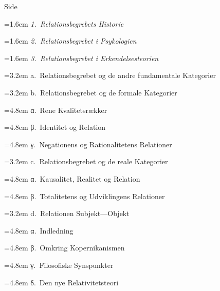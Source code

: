 \documentclass[12pt]{article}
\begin{document}
\vspace{1.2ex}
\begingroup
\parindent=0pt
\setlength{\parskip}{0pt}
\small
\mbox{}\hfill Side\par
\hangindent=1.6em \emph{1.~Relationsbegrebets Historie}\par
\hangindent=1.6em \emph{2.~Relationsbegrebet i Psykologien}\par
\hangindent=1.6em \emph{3.~Relationsbegrebet i Erkendelsesteorien}\par
\hangindent=3.2em \hspace*{1.6em}a.~Relationsbegrebet og de andre fundamentale Kategorier\par
\hangindent=3.2em \hspace*{1.6em}b.~Relationsbegrebet og de formale Kategorier\par
\hangindent=4.8em \hspace*{3.2em}α.~Rene Kvalitetsrækker\par
\hangindent=4.8em \hspace*{3.2em}β.~Identitet og Relation\par
\hangindent=4.8em \hspace*{3.2em}γ.~Negationens og Rationalitetens Relationer\par
\hangindent=3.2em \hspace*{1.6em}c.~Relationsbegrebet og de reale Kategorier\par
\hangindent=4.8em \hspace*{3.2em}α.~Kausalitet, Realitet og Relation\par
\hangindent=4.8em \hspace*{3.2em}β.~Totalitetens og Udviklingens Relationer\par
\hangindent=3.2em \hspace*{1.6em}d.~Relationen Subjekt---Objekt\par
\hangindent=4.8em \hspace*{3.2em}α.~Indledning\par
\hangindent=4.8em \hspace*{3.2em}β.~Omkring Kopernikanismen\par
\hangindent=4.8em \hspace*{3.2em}γ.~Filosofiske Synspunkter\par
\hangindent=4.8em \hspace*{3.2em}δ.~Den nye Relativitetsteori\par
\end{document}
